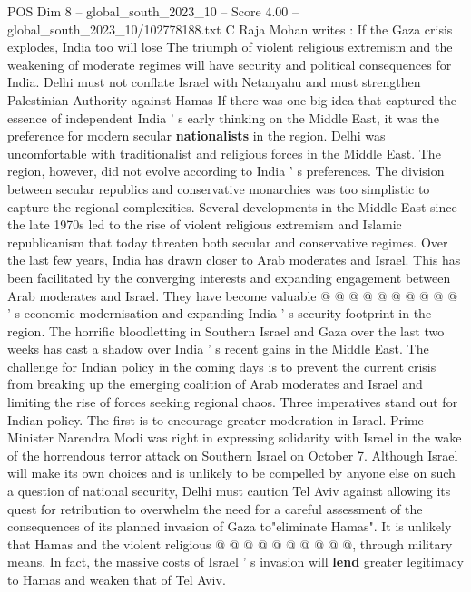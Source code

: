 \begin{textsample}{POS Dim 8 – global\_south\_2023\_10 – Score 4.00 – global\_south\_2023\_10/102778188.txt}  \label{ex:f8_pos_355}
C Raja Mohan writes : If the Gaza crisis explodes, India too will lose The triumph of violent religious extremism and the weakening of moderate regimes will have security and political consequences for India.
Delhi must not conflate Israel with Netanyahu and must strengthen Palestinian Authority against Hamas If there was one big idea that captured the essence of independent India ' s early thinking on the Middle East, it was the preference for modern secular \textbf{nationalists} in the region.
Delhi was uncomfortable with traditionalist and religious forces in the Middle East.
The region, however, did not evolve according to India ' s preferences.
The division between secular republics and conservative monarchies was too simplistic to capture the regional complexities.
Several developments in the Middle East since the late 1970s led to the rise of violent religious extremism and Islamic republicanism that today threaten both secular and conservative regimes.
Over the last few years, India has drawn closer to Arab moderates and Israel.
This has been facilitated by the converging interests and expanding engagement between Arab moderates and Israel.
They have become valuable @ @ @ @ @ @ @ @ @ @ ' s economic modernisation and expanding India ' s security footprint in the region.
The horrific bloodletting in Southern Israel and Gaza over the last two weeks has cast a shadow over India ' s recent gains in the Middle East.
The challenge for Indian policy in the coming days is to prevent the current crisis from breaking up the emerging coalition of Arab moderates and Israel and limiting the rise of forces seeking regional chaos.
Three imperatives stand out for Indian policy.
The first is to encourage greater moderation in Israel.
Prime Minister Narendra Modi was right in expressing solidarity with Israel in the wake of the horrendous terror attack on Southern Israel on October 7.
Although Israel will make its own choices and is unlikely to be compelled by anyone else on such a question of national security, Delhi must caution Tel Aviv against allowing its quest for retribution to overwhelm the need for a careful assessment of the consequences of its planned invasion of Gaza to"eliminate Hamas".
It is unlikely that Hamas and the violent religious @ @ @ @ @ @ @ @ @ @, through military means.
In fact, the massive costs of Israel ' s invasion will \textbf{lend} greater legitimacy to Hamas and weaken that of Tel Aviv.

\end{textsample}
